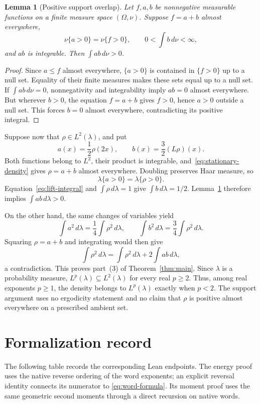 \documentclass[11pt]{article}
\newtheorem{lemma}[theorem]{Lemma}
\theoremstyle{remark}
\begin{document}
\begin{lemma}[Positive support overlap]\label{lem:support}
Let \(f,a,b\) be nonnegative measurable functions on a finite
measure space \((\Omega,\nu)\).  Suppose \(f=a+b\) almost
everywhere,
\[
  \nu\{a>0\}=\nu\{f>0\},\qquad
  0<\int b\,d\nu<\infty,
\]
and \(ab\) is integrable.  Then \(\int ab\,d\nu>0\).
\end{lemma}

\begin{proof}
Since \(a\leq f\) almost everywhere, \(\{a>0\}\) is contained
in \(\{f>0\}\) up to a null set.  Equality of their finite
measures makes these sets equal up to a null set.  If
\(\int ab\,d\nu=0\), nonnegativity and integrability imply
\(ab=0\) almost everywhere.  But wherever \(b>0\), the equation
\(f=a+b\) gives \(f>0\), hence \(a>0\) outside a null set.
This forces \(b=0\) almost everywhere, contradicting its positive
integral.
\end{proof}

Suppose now that \(\rho\in L^2(\lambda)\), and put
\[
  a(x)=\frac12\rho(2x),\qquad b(x)=\frac32(L\rho)(x).
\]
Both functions belong to \(L^2\), their product is integrable,
and~\eqref{eq:stationary-density} gives \(\rho=a+b\) almost
everywhere.  Doubling preserves Haar measure, so
\[
  \lambda\{a>0\}=\lambda\{\rho>0\}.
\]
Equation~\eqref{eq:lift-integral} and \(\int\rho\,d\lambda=1\)
give \(\int b\,d\lambda=1/2\).  Lemma~\ref{lem:support}
therefore implies \(\int ab\,d\lambda>0\).

On the other hand, the same changes of variables yield
\[
  \int a^2\,d\lambda=\frac14\int\rho^2\,d\lambda,
  \qquad
  \int b^2\,d\lambda=\frac34\int\rho^2\,d\lambda.
\]
Squaring \(\rho=a+b\) and integrating would then give
\[
  \int\rho^2\,d\lambda
   =\int\rho^2\,d\lambda+2\int ab\,d\lambda,
\]
a contradiction.  This proves part~(3) of
Theorem~\ref{thm:main}.  Since \(\lambda\) is a probability measure,
\(L^p(\lambda)\subseteq L^2(\lambda)\) for every real \(p\geq2\).
Thus, among real exponents \(p\geq1\), the density belongs to
\(L^p(\lambda)\) exactly when \(p<2\).
The support argument uses no ergodicity
statement and no claim that \(\rho\) is positive almost everywhere
on a prescribed ambient set.

\clearpage
\section*{Formalization record}

The following table records the corresponding Lean endpoints.  The
energy proof uses the native reverse ordering of the word exponents;
an explicit reversal identity connects its numerator to
\eqref{eq:word-formula}.  Its moment proof uses the same geometric
second moments through a direct recursion on native words.
\end{document}
